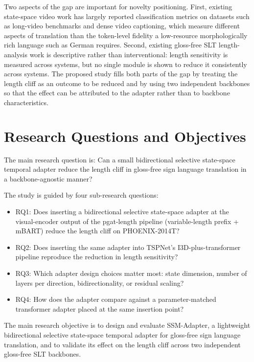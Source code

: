 Two aspects of the gap are important for novelty positioning. First, existing state-space video work has largely reported classification metrics on datasets such as long-video benchmarks and dense video captioning, which measure different aspects of translation than the token-level fidelity a low-resource morphologically rich language such as German requires. Second, existing gloss-free SLT length-analysis work is descriptive rather than interventional: length sensitivity is measured across systems, but no single module is shown to reduce it consistently across systems. The proposed study fills both parts of the gap by treating the length cliff as an outcome to be reduced and by using two independent backbones so that the effect can be attributed to the adapter rather than to backbone characteristics.

\section{Research Questions and Objectives}

The main research question is: Can a small bidirectional selective state-space temporal adapter reduce the length cliff in gloss-free sign language translation in a backbone-agnostic manner?

The study is guided by four sub-research questions:
\begin{itemize}
    \item RQ1: Does inserting a bidirectional selective state-space adapter at the visual-encoder output of the pgat-length pipeline (variable-length prefix + mBART) reduce the length cliff on PHOENIX-2014T?
    \item RQ2: Does inserting the same adapter into TSPNet's I3D-plus-transformer pipeline reproduce the reduction in length sensitivity?
    \item RQ3: Which adapter design choices matter most: state dimension, number of layers per direction, bidirectionality, or residual scaling?
    \item RQ4: How does the adapter compare against a parameter-matched transformer adapter placed at the same insertion point?
\end{itemize}

The main research objective is to design and evaluate SSM-Adapter, a lightweight bidirectional selective state-space temporal adapter for gloss-free sign language translation, and to validate its effect on the length cliff across two independent gloss-free SLT backbones.

